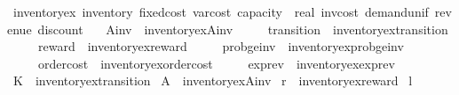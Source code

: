 \begin{isabellebody}
\isamarkupfalse%
\ inventory{\isacharunderscore}{\kern0pt}ex{\isacharcolon}{\kern0pt}\ inventory\ fixed{\isacharunderscore}{\kern0pt}cost\ {\isachardoublequoteopen}var{\isacharunderscore}{\kern0pt}cost{\isacharcolon}{\kern0pt}{\isacharcolon}{\kern0pt}\ capacity\ {\isasymRightarrow}\ real{\isachardoublequoteclose}\ inv{\isacharunderscore}{\kern0pt}cost\ demand{\isacharunderscore}{\kern0pt}unif\ revenue\ discount\isanewline
\ \ \ A{\isacharunderscore}{\kern0pt}inv\ {\isacharequal}{\kern0pt}\ inventory{\isacharunderscore}{\kern0pt}ex{\isachardot}{\kern0pt}A{\isacharunderscore}{\kern0pt}inv\isanewline
\ \ \ \ \ transition\ {\isacharequal}{\kern0pt}\ inventory{\isacharunderscore}{\kern0pt}ex{\isachardot}{\kern0pt}transition\isanewline
\ \ \ \ \ reward\ {\isacharequal}{\kern0pt}\ inventory{\isacharunderscore}{\kern0pt}ex{\isachardot}{\kern0pt}reward\isanewline
\ \ \ \ \ prob{\isacharunderscore}{\kern0pt}ge{\isacharunderscore}{\kern0pt}inv\ {\isacharequal}{\kern0pt}\ inventory{\isacharunderscore}{\kern0pt}ex{\isachardot}{\kern0pt}prob{\isacharunderscore}{\kern0pt}ge{\isacharunderscore}{\kern0pt}inv\isanewline
\ \ \ \ \ order{\isacharunderscore}{\kern0pt}cost\ {\isacharequal}{\kern0pt}\ inventory{\isacharunderscore}{\kern0pt}ex{\isachardot}{\kern0pt}order{\isacharunderscore}{\kern0pt}cost\isanewline
\ \ \ \ \ exp{\isacharunderscore}{\kern0pt}rev\ {\isacharequal}{\kern0pt}\ inventory{\isacharunderscore}{\kern0pt}ex{\isachardot}{\kern0pt}exp{\isacharunderscore}{\kern0pt}rev%
\isadelimproof
%
\endisadelimproof
%
\isatagproof
\isacommand{{\isachardot}{\kern0pt}}\isamarkupfalse%
%
\endisatagproof
{\isafoldproof}%
%
\isadelimproof
%
\endisadelimproof
\isanewline
\isanewline
{}\isamarkupfalse%
\ {\isachardoublequoteopen}K\ {\isasymequiv}\ inventory{\isacharunderscore}{\kern0pt}ex{\isachardot}{\kern0pt}transition{\isachardoublequoteclose}\isanewline
{}\isamarkupfalse%
\ {\isachardoublequoteopen}A\ {\isasymequiv}\ inventory{\isacharunderscore}{\kern0pt}ex{\isachardot}{\kern0pt}A{\isacharunderscore}{\kern0pt}inv{\isachardoublequoteclose}\isanewline
{}\isamarkupfalse%
\ {\isachardoublequoteopen}r\ {\isasymequiv}\ inventory{\isacharunderscore}{\kern0pt}ex{\isachardot}{\kern0pt}reward{\isachardoublequoteclose}\isanewline
{}\isamarkupfalse%
\ {\isachardoublequoteopen}l\ {\isasymequiv}\ {}{\isachardot}{\kern0pt}{}{}{\isachardoublequoteclose}\isanewline

\end{isabellebody}
